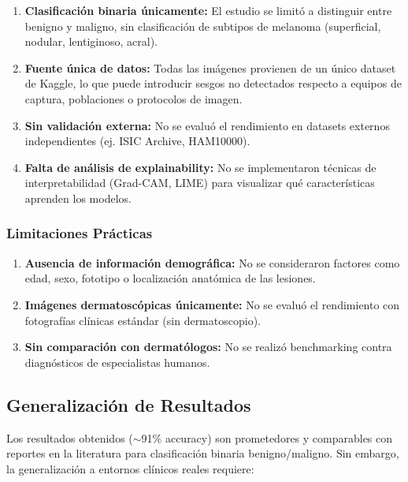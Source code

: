 \documentclass[11pt, a4paper]{article}
\begin{document}
\begin{enumerate}
    \item \textbf{Clasificación binaria únicamente:} El estudio se limitó a distinguir entre benigno y maligno, sin clasificación de subtipos de melanoma (superficial, nodular, lentiginoso, acral).
    
    \item \textbf{Fuente única de datos:} Todas las imágenes provienen de un único dataset de Kaggle, lo que puede introducir sesgos no detectados respecto a equipos de captura, poblaciones o protocolos de imagen.
    
    \item \textbf{Sin validación externa:} No se evaluó el rendimiento en datasets externos independientes (ej. ISIC Archive, HAM10000).
    
    \item \textbf{Falta de análisis de explainability:} No se implementaron técnicas de interpretabilidad (Grad-CAM, LIME) para visualizar qué características aprenden los modelos.
\end{enumerate}

\subsubsection{Limitaciones Prácticas}

\begin{enumerate}
    \item \textbf{Ausencia de información demográfica:} No se consideraron factores como edad, sexo, fototipo o localización anatómica de las lesiones.
    
    \item \textbf{Imágenes dermatoscópicas únicamente:} No se evaluó el rendimiento con fotografías clínicas estándar (sin dermatoscopio).
    
    \item \textbf{Sin comparación con dermatólogos:} No se realizó benchmarking contra diagnósticos de especialistas humanos.
\end{enumerate}

\subsection{Generalización de Resultados}

Los resultados obtenidos ($\sim$91\% accuracy) son prometedores y comparables con reportes en la literatura para clasificación binaria benigno/maligno. Sin embargo, la generalización a entornos clínicos reales requiere:
\end{document}
